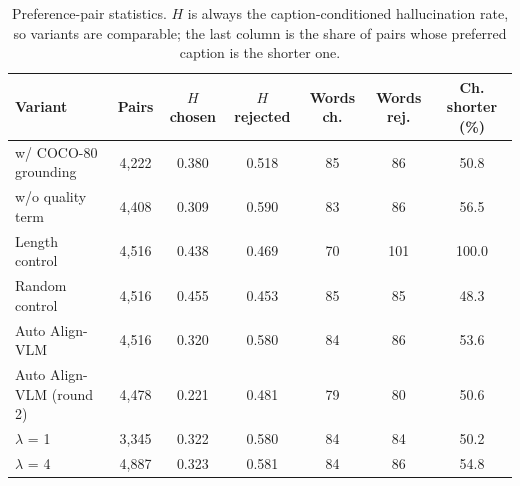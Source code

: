 \begin{table}[t]
\centering
\small
\caption{Preference-pair statistics. $H$ is always the caption-conditioned hallucination rate, so variants are comparable; the last column is the share of pairs whose preferred caption is the shorter one.}
\label{tab:pairs}
\begin{tabular}{lcccccc}
\toprule
Variant & Pairs & $H$ chosen & $H$ rejected & Words ch. & Words rej. & Ch. shorter (\%) \\
\midrule
w/ COCO-80 grounding & 4,222 & 0.380 & 0.518 & 85 & 86 & 50.8 \\
w/o quality term & 4,408 & 0.309 & 0.590 & 83 & 86 & 56.5 \\
Length control & 4,516 & 0.438 & 0.469 & 70 & 101 & 100.0 \\
Random control & 4,516 & 0.455 & 0.453 & 85 & 85 & 48.3 \\
Auto Align-VLM & 4,516 & 0.320 & 0.580 & 84 & 86 & 53.6 \\
Auto Align-VLM (round 2) & 4,478 & 0.221 & 0.481 & 79 & 80 & 50.6 \\
$\lambda$ = 1 & 3,345 & 0.322 & 0.580 & 84 & 84 & 50.2 \\
$\lambda$ = 4 & 4,887 & 0.323 & 0.581 & 84 & 86 & 54.8 \\
\bottomrule
\end{tabular}
\end{table}
